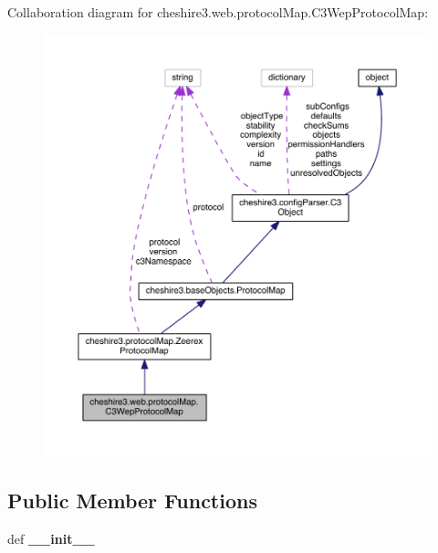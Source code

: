 Collaboration diagram for cheshire3.\-web.\-protocol\-Map.\-C3\-Wep\-Protocol\-Map\-:
\nopagebreak
\begin{figure}[H]
\begin{center}
\leavevmode
\includegraphics[width=350pt]{classcheshire3_1_1web_1_1protocol_map_1_1_c3_wep_protocol_map__coll__graph}
\end{center}
\end{figure}
\subsection*{Public Member Functions}
\begin{DoxyCompactItemize}
\item 
\hypertarget{classcheshire3_1_1web_1_1protocol_map_1_1_c3_wep_protocol_map_a75611d08b8897a8fb1fb43d5361c3555}{def {\bfseries \-\_\-\-\_\-init\-\_\-\-\_\-}}\label{classcheshire3_1_1web_1_1protocol_map_1_1_c3_wep_protocol_map_a75611d08b8897a8fb1fb43d5361c3555}

\end{DoxyCompactItemize}
